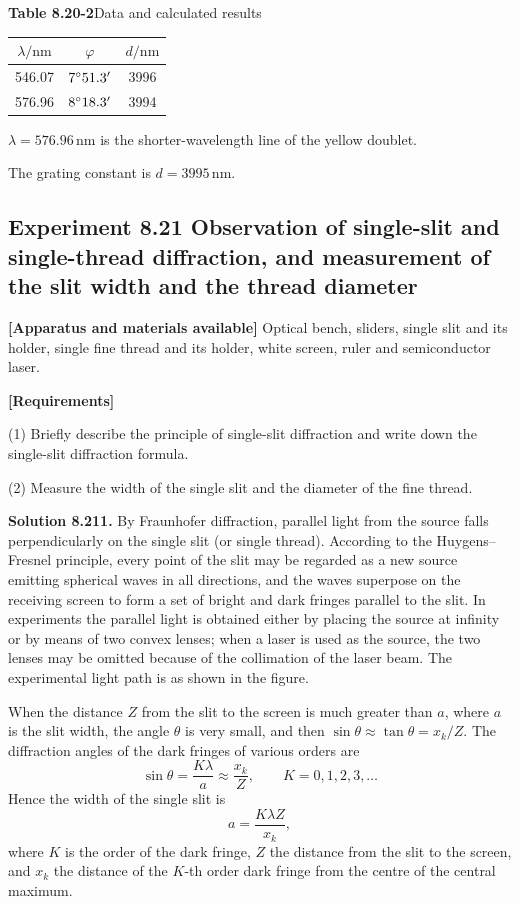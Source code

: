 \begin{center}
\textbf{Table 8.20-2}\quad Data and calculated results\\[3pt]
\begin{tabular}{ccc}
\toprule
$\lambda/\mathrm{nm}$ & $\varphi$ & $d/\mathrm{nm}$ \\
\midrule
546.07 & $7^{\circ}51.3'$ & 3996 \\
576.96 & $8^{\circ}18.3'$ & 3994 \\
\bottomrule
\end{tabular}
\end{center}

$\lambda=576.96\,\mathrm{nm}$ is the shorter-wavelength line of the yellow doublet.

The grating constant is $d=3995\,\mathrm{nm}$.

\subsection*{Experiment 8.21 \quad Observation of single-slit and single-thread diffraction, and measurement of the slit width and the thread diameter}

\textbf{[Apparatus and materials available]} Optical bench, sliders, single slit and its holder, single fine thread and its holder, white screen, ruler and semiconductor laser.

\textbf{[Requirements]}

(1) Briefly describe the principle of single-slit diffraction and write down the single-slit diffraction formula.

(2) Measure the width of the single slit and the diameter of the fine thread.

\textbf{Solution 8.21}\quad \textbf{1.} By Fraunhofer diffraction, parallel light from the source falls perpendicularly on the single slit (or single thread). According to the Huygens--Fresnel principle, every point of the slit may be regarded as a new source emitting spherical waves in all directions, and the waves superpose on the receiving screen to form a set of bright and dark fringes parallel to the slit. In experiments the parallel light is obtained either by placing the source at infinity or by means of two convex lenses; when a laser is used as the source, the two lenses may be omitted because of the collimation of the laser beam. The experimental light path is as shown in the figure.

When the distance $Z$ from the slit to the screen is much greater than $a$, where $a$ is the slit width, the angle $\theta$ is very small, and then $\sin\theta\approx\tan\theta=x_k/Z$. The diffraction angles of the dark fringes of various orders are
\begin{equation}
\sin\theta=\frac{K\lambda}{a}\approx\frac{x_k}{Z},\qquad K=0,1,2,3,\ldots \tag{1}
\end{equation}
Hence the width of the single slit is
\begin{equation}
a=\frac{K\lambda Z}{x_k}, \tag{2}
\end{equation}
where $K$ is the order of the dark fringe, $Z$ the distance from the slit to the screen, and $x_k$ the distance of the $K$-th order dark fringe from the centre of the central maximum.

